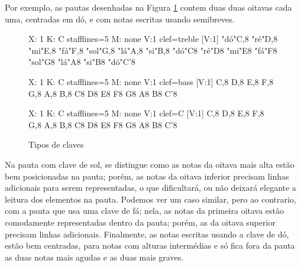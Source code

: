 Por exemplo, as pautas desenhadas na Figura \ref{fig:allnotesclaves} 
contem duas duas oitavas cada uma, centradas em dó, e com notas escritas usando semibreves.
\begin{figure}[h]
    \centering
\begin{abc}[name=abc-clavenotessol]
%
X: 1 %
K: C stafflines=5 %
M: none %
V:1 clef=treble %
%
[V:1] "dó"C,8 "ré"D,8 "mi"E,8 "fá"F,8  "sol"G,8 "lá"A,8 "si"B,8 "dó"C8 "ré"D8 "mi"E8 "fá"F8  "sol"G8 "lá"A8 "si"B8 "dó"C'8 
\end{abc}

\begin{abc}[name=abc-clavenotesfa]
%
X: 1 %
K: C stafflines=5 %
M: none %
V:1 clef=bass %
%
[V:1] C,8 D,8 E,8 F,8 G,8 A,8 B,8 C8 D8 E8 F8 G8 A8 B8 C'8 
\end{abc}

\begin{abc}[name=abc-clavenotesdo]
%
X: 1 %
K: C stafflines=5 %
M: none %
V:1 clef=C %
%
[V:1] C,8 D,8 E,8 F,8 G,8 A,8 B,8 C8 D8 E8 F8 G8 A8 B8 C'8 
\end{abc}
    \caption{Tipos de claves}\label{fig:allnotesclaves}
\end{figure}
Na pauta com clave de sol, 
se distingue como as notas da oitava mais alta estão bem posicionadas na pauta;
porém, as notas da oitava inferior precisam linhas adicionais para serem representadas,
o que dificultará, ou não deixará elegante a leitura dos elementos na pauta.
Podemos ver um caso similar, pero ao contrario, com a pauta que usa uma clave de fá;
nela, as notas da primeira oitava estão comodamente representadas dentro da pauta;
porém, as da oitava superior precisam linhas adicionais.
Finalmente, as notas escritas usando a clave de dó, estão bem centradas,
para notas com alturas intermédias e só fica fora da pauta as duas notas mais agudas e as duas mais graves.

